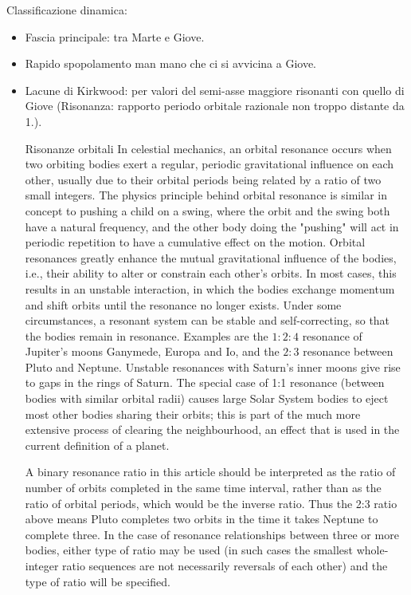 Classificazione dinamica:
\begin{itemize}
    \item Fascia principale: tra Marte e Giove.
    \item Rapido spopolamento man mano che ci si avvicina a Giove.
    \item Lacune di Kirkwood: per valori del semi-asse maggiore risonanti con quello di Giove
    (Risonanza: rapporto periodo orbitale razionale non troppo distante da 1.).
    
    \begin{definition}{Risonanze orbitali}
    In celestial mechanics, an orbital resonance occurs when two orbiting bodies exert a regular, periodic gravitational influence on each other, usually due to their orbital periods being related by a ratio of two small integers. The physics principle behind orbital resonance is similar in concept to pushing a child on a swing, where the orbit and the swing both have a natural frequency, and the other body doing the "pushing" will act in periodic repetition to have a cumulative effect on the motion. Orbital resonances greatly enhance the mutual gravitational influence of the bodies, i.e., their ability to alter or constrain each other's orbits. In most cases, this results in an unstable interaction, in which the bodies exchange momentum and shift orbits until the resonance no longer exists. Under some circumstances, a resonant system can be stable and self-correcting, so that the bodies remain in resonance. Examples are the $1:2:4$ resonance of Jupiter's moons Ganymede, Europa and Io, and the $2:3$ resonance between Pluto and Neptune. Unstable resonances with Saturn's inner moons give rise to gaps in the rings of Saturn. The special case of 1:1 resonance (between bodies with similar orbital radii) causes large Solar System bodies to eject most other bodies sharing their orbits; this is part of the much more extensive process of clearing the neighbourhood, an effect that is used in the current definition of a planet.

A binary resonance ratio in this article should be interpreted as the ratio of number of orbits completed in the same time interval, rather than as the ratio of orbital periods, which would be the inverse ratio. Thus the 2:3 ratio above means Pluto completes two orbits in the time it takes Neptune to complete three. In the case of resonance relationships between three or more bodies, either type of ratio may be used (in such cases the smallest whole-integer ratio sequences are not necessarily reversals of each other) and the type of ratio will be specified.
    \end{definition}
\end{itemize}

